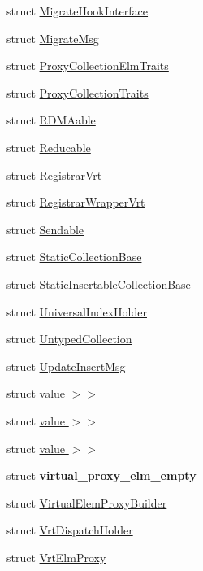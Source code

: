 \begin{DoxyCompactItemize}
struct \hyperlink{structvt_1_1vrt_1_1collection_1_1_migrate_hook_interface}{Migrate\+Hook\+Interface}
\item 
struct \hyperlink{structvt_1_1vrt_1_1collection_1_1_migrate_msg}{Migrate\+Msg}
\item 
struct \hyperlink{structvt_1_1vrt_1_1collection_1_1_proxy_collection_elm_traits}{Proxy\+Collection\+Elm\+Traits}
\item 
struct \hyperlink{structvt_1_1vrt_1_1collection_1_1_proxy_collection_traits}{Proxy\+Collection\+Traits}
\item 
struct \hyperlink{structvt_1_1vrt_1_1collection_1_1_r_d_m_aable}{R\+D\+M\+Aable}
\item 
struct \hyperlink{structvt_1_1vrt_1_1collection_1_1_reducable}{Reducable}
\item 
struct \hyperlink{structvt_1_1vrt_1_1collection_1_1_registrar_vrt}{Registrar\+Vrt}
\item 
struct \hyperlink{structvt_1_1vrt_1_1collection_1_1_registrar_wrapper_vrt}{Registrar\+Wrapper\+Vrt}
\item 
struct \hyperlink{structvt_1_1vrt_1_1collection_1_1_sendable}{Sendable}
\item 
struct \hyperlink{structvt_1_1vrt_1_1collection_1_1_static_collection_base}{Static\+Collection\+Base}
\item 
struct \hyperlink{structvt_1_1vrt_1_1collection_1_1_static_insertable_collection_base}{Static\+Insertable\+Collection\+Base}
\item 
struct \hyperlink{structvt_1_1vrt_1_1collection_1_1_universal_index_holder}{Universal\+Index\+Holder}
\item 
struct \hyperlink{structvt_1_1vrt_1_1collection_1_1_untyped_collection}{Untyped\+Collection}
\item 
struct \hyperlink{structvt_1_1vrt_1_1collection_1_1_update_insert_msg}{Update\+Insert\+Msg}
\item 
struct \hyperlink{structvt_1_1vrt_1_1collection_1_1_default_map_3_01_collection_t_00_01typename_01std_1_1enable__i0c13cd14d7af17b34311bb8ce93d9804}{value $>$$>$}
\item 
struct \hyperlink{structvt_1_1vrt_1_1collection_1_1_default_map_3_01_collection_t_00_01typename_01std_1_1enable__id31d055881d6867942086ee5834ad7b4}{value $>$$>$}
\item 
struct \hyperlink{structvt_1_1vrt_1_1collection_1_1_default_map_3_01_collection_t_00_01typename_01std_1_1enable__ib7e55b659c64f165e6a671fb7294e371}{value $>$$>$}
\item 
struct {\bfseries virtual\+\_\+proxy\+\_\+elm\+\_\+empty}
\item 
struct \hyperlink{structvt_1_1vrt_1_1collection_1_1_virtual_elem_proxy_builder}{Virtual\+Elem\+Proxy\+Builder}
\item 
struct \hyperlink{structvt_1_1vrt_1_1collection_1_1_vrt_dispatch_holder}{Vrt\+Dispatch\+Holder}
\item 
struct \hyperlink{structvt_1_1vrt_1_1collection_1_1_vrt_elm_proxy}{Vrt\+Elm\+Proxy}
\end{DoxyCompactItemize}
